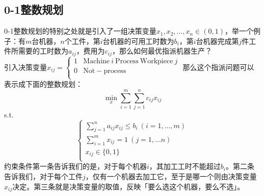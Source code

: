 \documentclass[11pt,a4paper]{article}
\begin{document}
\subsection{0-1整数规划}
0-1整数规划的特别之处就是引入了一组决策变量$x_1,x_2,...,x_n\in (0,1)$，举一个例子：有$m$台机器，$n$个工件，第$i$台机器的可用工时数为$b_i$，第$i$台机器完成第$j$件工件所需要的工时数为$a_{ij}$，费用为$c_{ij}$，那么如何最优指派机器生产？\\
引入决策变量$x_{ij}=\begin{cases}
1 & \mathrm{Machine}\ i \ \mathrm{Process \ Workpiece} \ j \\
0 & \mathrm{Not-process}\\
\end{cases}$
那么这个指派问题可以表示成下面的整数规划：
\begin{equation*}
	\min\limits_{x} \sum_{i=1}^{m} \sum_{j=1}^{n} c_{ij}x_{ij} 
\end{equation*}
s.t.\\
\begin{equation*}
	\begin{cases}
	 \sum_{j=1}^{n} a_{ij}x_{ij} \le b_i \ (i=1,...,m) \\
	 \sum_{i=1}^{m}x_{ij}=1 \ (j=1,...n) \\
	 x_{ij}\in \{0,1\} \\
	\end{cases}
\end{equation*}
约束条件第一条告诉我们的是，对于每个机器$i$，其加工工时不能超过$b_i$。第二条告诉我们，对于每个工件$j$，仅有一个机器去加工它，至于是哪一个则由决策变量$x_{ij}$决定。第三条就是决策变量的取值，反映「要么选这个机器，要么不选」。
\end{document}
